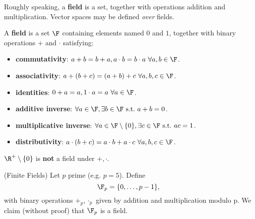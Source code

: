 \documentclass[math0540-lecture-notes.tex]{subfiles}
\begin{document}
Roughly speaking, a \textbf{field} is a set, together with operations addition and multiplication.
Vector spaces may be defined \textit{over} fields.
\begin{definition}[Fields]{}
  A \textbf{field} is a set $\F$ containing elements named $0$ and $1$, together with binary
  operations  $+$ and $\cdot $ satisfying:
  \begin{itemize}
    \item \textbf{commutativity}: $a+b=b+a, a\cdot b=b\cdot a~\forall a,b\in \F$.
    \item \textbf{associativity}: $a+(b+c)=(a+b)+c~\forall a,b,c\in \F$.
    \item \textbf{identities}: $0+a=a, 1\cdot a=a~\forall a\in \F$.
    \item \textbf{additive inverse}: $\forall a\in \F, \exists b\in \F~\text{s.t.}~a+b=0$.
    \item \textbf{multiplicative inverse}: $\forall a\in \F\setminus \{ 0 \}, \exists c\in
      \F~\text{s.t.}~ac=1$.
    \item \textbf{distributivity}: $a\cdot (b+c) = a\cdot b+a\cdot c~\forall a,b,c\in \F$.
  \end{itemize}
\end{definition}
\begin{example}
  $\R^{+}\setminus \{ 0 \}$ is \textbf{not} a field under $+,\cdot $.
\end{example}

\begin{example}
  (Finite Fields) Let $p$ prime (e.g. $p=5$). Define \[
      \F_p = \{0,\ldots,p-1\} 
  ,\] with binary operations $+_p,\cdot_p $ given by addition and multiplication modulo p. We claim
  (without proof) that $\F_p$ is a field.
\end{example}
\end{document}
